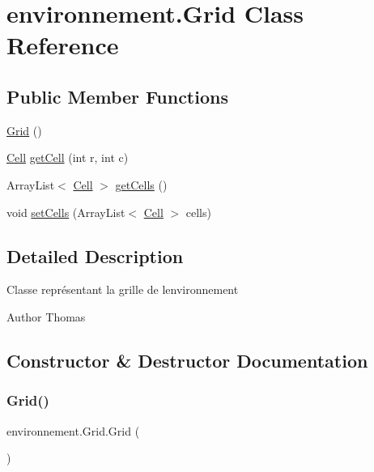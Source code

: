 \hypertarget{classenvironnement_1_1_grid}{}\section{environnement.\+Grid Class Reference}
\label{classenvironnement_1_1_grid}
\subsection*{Public Member Functions}
\begin{DoxyCompactItemize}
\item 
\hyperlink{classenvironnement_1_1_grid_a1757a9849685f20e0bb3bd84a3cf9cb7}{Grid} ()
\item 
\hyperlink{classenvironnement_1_1_cell}{Cell} \hyperlink{classenvironnement_1_1_grid_a81df13c46a58ff1f2accb6debafcced7}{get\+Cell} (int r, int c)
\item 
Array\+List$<$ \hyperlink{classenvironnement_1_1_cell}{Cell} $>$ \hyperlink{classenvironnement_1_1_grid_abaf214d02e4a27765bb266d5e46741de}{get\+Cells} ()
\item 
void \hyperlink{classenvironnement_1_1_grid_a1ea7cb1aa53fa6c45291ad29349731b2}{set\+Cells} (Array\+List$<$ \hyperlink{classenvironnement_1_1_cell}{Cell} $>$ cells)
\end{DoxyCompactItemize}


\subsection{Detailed Description}
Classe représentant la grille de l\textquotesingle{}environnement \begin{DoxyAuthor}{Author}
Thomas 
\end{DoxyAuthor}


\subsection{Constructor \& Destructor Documentation}
\hypertarget{classenvironnement_1_1_grid_a1757a9849685f20e0bb3bd84a3cf9cb7}{}\label{classenvironnement_1_1_grid_a1757a9849685f20e0bb3bd84a3cf9cb7} 
\subsubsection{\texorpdfstring{Grid()}{Grid()}}
{\footnotesize\ttfamily environnement.\+Grid.\+Grid (\begin{DoxyParamCaption}{ }\end{DoxyParamCaption})}

